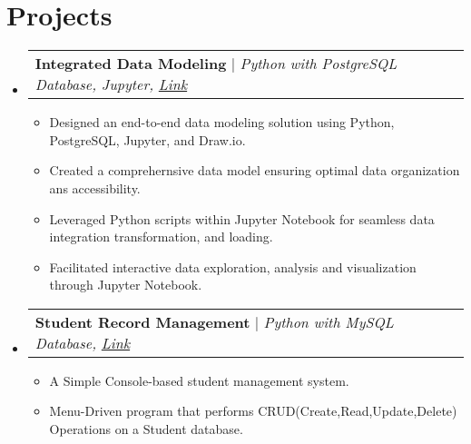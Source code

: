 \documentclass[letterpaper,11pt]{article}
\makeatletter
\newcommand{\resumeItem}[1]{
  \item\small{
    {#1 \vspace{-2pt}}
  }
}
\newcommand{\resumeProjectHeading}[2]{
    \item
    \begin{tabular*}{1.001\textwidth}{l@{\extracolsep{\fill}}r}
      \small#1 & \textbf{\small #2}\\
    \end{tabular*}\vspace{-7pt}
}
\newcommand{\resumeSubHeadingListStart}{\begin{itemize}[leftmargin=0.0in, label={}]}
\newcommand{\resumeSubHeadingListEnd}{\end{itemize}}
\newcommand{\resumeItemListStart}{\begin{itemize}}
\newcommand{\resumeItemListEnd}{\end{itemize}\vspace{-5pt}}
\makeatother
\begin{document}
\section{Projects}
    \vspace{-6pt}
    \resumeSubHeadingListStart
    \resumeProjectHeading
          {\textbf{Integrated Data Modeling} $|$ \emph{Python with PostgreSQL Database, Jupyter, \href{https://github.com/izhangit/Integrated-Data-Modeling/}{Link}}}{}
          \resumeItemListStart
            \resumeItem{ Designed an end-to-end data modeling solution using Python, PostgreSQL, Jupyter, and Draw.io.}
            \resumeItem{Created a comprehernsive data model ensuring optimal data organization ans accessibility.}
            \resumeItem{Leveraged Python scripts within Jupyter Notebook for seamless data integration transformation, and loading.}
            \resumeItem{Facilitated interactive data exploration, analysis and visualization through Jupyter Notebook.}
          \resumeItemListEnd
          \vspace{-14pt}

              \resumeProjectHeading
          {\textbf{Student Record Management} $|$ \emph{Python with MySQL Database, \href{https://github.com/izhangit/Student-Record-Management/}{Link}}}{}
          \resumeItemListStart
            \resumeItem{ A Simple Console-based student management system.}
            \resumeItem{Menu-Driven program that performs CRUD(Create,Read,Update,Delete) Operations on a Student database.}
          \resumeItemListEnd
          \vspace{-11pt}
    \resumeSubHeadingListEnd
\vspace{-01pt}
\end{document}
